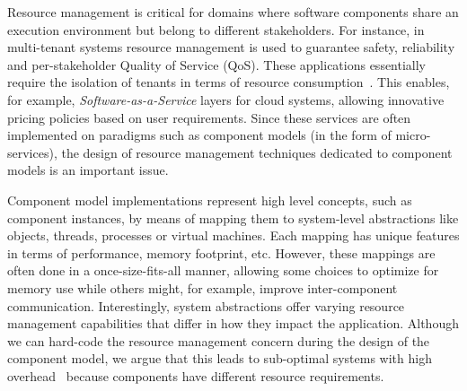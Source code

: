 
Resource management is critical for domains where software components share an execution environment but belong to different stakeholders.
For instance, in multi-tenant systems resource management is used to guarantee safety, reliability and per-stakeholder Quality of Service (QoS).
These applications essentially require the isolation of tenants in terms of resource consumption~\cite{KrWeKo2013-icwe-MTBenchmark}.
This enables, for example, \textit{Software-as-a-Service} layers for cloud systems, allowing innovative pricing policies based on user requirements. %
Since these services are often implemented on paradigms such as component models (in the form of micro-services),
the design of resource management techniques dedicated to component models is an important issue.

Component model implementations represent high level concepts, such as component instances, by means of mapping them to system-level abstractions like objects, threads, processes or virtual machines.
Each mapping has unique features in terms of performance, memory footprint, etc.
However, these mappings are often done in a once-size-fits-all manner, allowing some choices to optimize for memory use while others might, for example, improve inter-component communication.
Interestingly, system abstractions offer varying resource management capabilities that differ in how they impact the application.
Although we can hard-code the resource management concern during the design of the component model, we argue that this leads to sub-optimal systems with high  overhead~\cite{binder_portable_2006,czajkowski_jres:_1998,Maurel:2012:AME:2304736.2304763} because components have different resource requirements.

